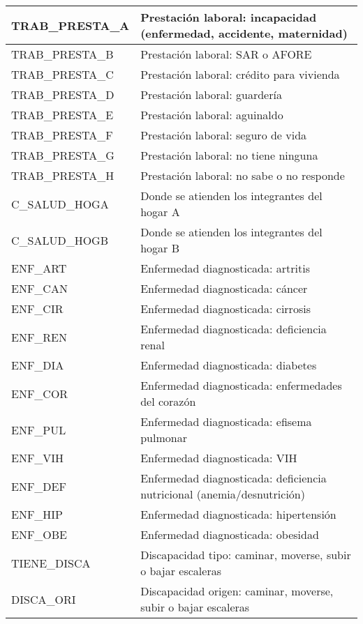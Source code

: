 \begin{longtable}{|p{8cm}|p{8cm}|}
    \hline
    TRAB\_PRESTA\_A & Prestación laboral: incapacidad (enfermedad, accidente, maternidad)\\
    \hline
    TRAB\_PRESTA\_B & Prestación laboral: SAR o AFORE \\
    \hline
    TRAB\_PRESTA\_C & Prestación laboral: crédito para vivienda \\
    \hline
    TRAB\_PRESTA\_D & Prestación laboral: guardería \\
    \hline
    TRAB\_PRESTA\_E & Prestación laboral: aguinaldo \\
    \hline
    TRAB\_PRESTA\_F & Prestación laboral: seguro de vida \\
    \hline
    TRAB\_PRESTA\_G & Prestación laboral: no tiene ninguna \\
    \hline
    TRAB\_PRESTA\_H & Prestación laboral: no sabe o no responde \\
    \hline
    C\_SALUD\_HOGA & Donde se atienden los integrantes del hogar A \\
    \hline
    C\_SALUD\_HOGB & Donde se atienden los integrantes del hogar B \\
    \hline
    ENF\_ART & Enfermedad diagnosticada: artritis \\
    \hline
    ENF\_CAN & Enfermedad diagnosticada: cáncer \\
    \hline
    ENF\_CIR & Enfermedad diagnosticada: cirrosis \\
    \hline
    ENF\_REN & Enfermedad diagnosticada: deficiencia renal \\
    \hline
    ENF\_DIA & Enfermedad diagnosticada: diabetes \\
    \hline
    ENF\_COR & Enfermedad diagnosticada: enfermedades del corazón \\
    \hline
    ENF\_PUL & Enfermedad diagnosticada: efisema pulmonar \\
    \hline
    ENF\_VIH & Enfermedad diagnosticada: VIH \\
    \hline
    ENF\_DEF & Enfermedad diagnosticada: deficiencia nutricional (anemia/desnutrición) \\
    \hline
    ENF\_HIP & Enfermedad diagnosticada: hipertensión \\
    \hline
    ENF\_OBE & Enfermedad diagnosticada: obesidad \\
    \hline
    TIENE\_DISCA & Discapacidad tipo: caminar, moverse, subir o bajar escaleras \\
    \hline
    DISCA\_ORI & Discapacidad origen: caminar, moverse, subir o bajar escaleras  \\

\end{longtable}
